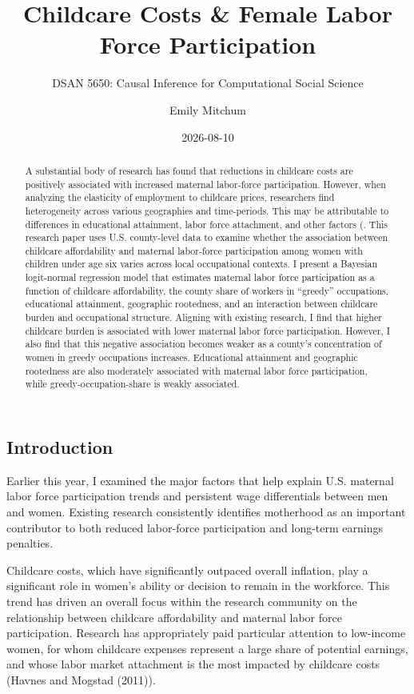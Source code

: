 \documentclass[
  letterpaper,
  DIV=11,
  numbers=noendperiod]{scrartcl}
\title{Childcare Costs \& Female Labor Force Participation}
\subtitle{DSAN 5650: Causal Inference for Computational Social Science}
\author{Emily Mitchum}
\date{2026-08-10}
\begin{document}
\maketitle
\begin{abstract}
A substantial body of research has found that reductions in childcare
costs are positively associated with increased maternal labor-force
participation. However, when analyzing the elasticity of employment to
childcare prices, researchers find heterogeneity across various
geographies and time-periods. This may be attributable to differences in
educational attainment, labor force attachment, and other factors (.
This research paper uses U.S. county-level data to examine whether the
association between childcare affordability and maternal labor-force
participation among women with children under age six varies across
local occupational contexts. I present a Bayesian logit-normal
regression model that estimates maternal labor force participation as a
function of childcare affordability, the county share of workers in
``greedy'' occupations, educational attainment, geographic rootedness,
and an interaction between childcare burden and occupational structure.
Aligning with existing research, I find that higher childcare burden is
associated with lower maternal labor force participation. However, I
also find that this negative association becomes weaker as a county's
concentration of women in greedy occupations increases. Educational
attainment and geographic rootedness are also moderately associated with
maternal labor force participation, while greedy-occupation-share is
weakly associated.
\end{abstract}


\subsection{Introduction}\label{sec-1}

Earlier this year, I examined the major factors that help explain U.S.
maternal labor force participation trends and persistent wage
differentials between men and women. Existing research consistently
identifies motherhood as an important contributor to both reduced
labor-force participation and long-term earnings penalties.

Childcare costs, which have significantly outpaced overall inflation,
play a significant role in women's ability or decision to remain in the
workforce. This trend has driven an overall focus within the research
community on the relationship between childcare affordability and
maternal labor force participation. Research has appropriately paid
particular attention to low-income women, for whom childcare expenses
represent a large share of potential earnings, and whose labor market
attachment is the most impacted by childcare costs (Havnes and Mogstad
(2011)).
\end{document}
